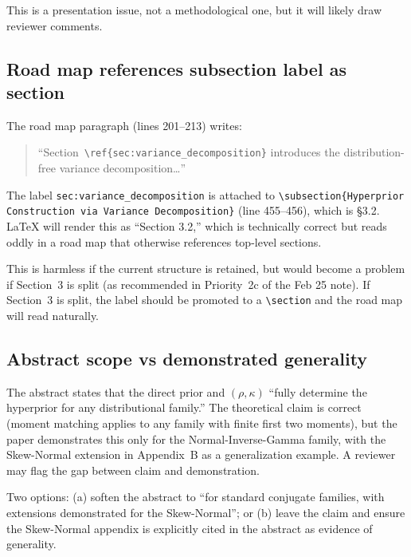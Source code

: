 \documentclass[12pt,a4paper]{article}
\begin{document}
This is a presentation issue, not a methodological one, but it will likely
draw reviewer comments.


\subsection{Road map references subsection label as section}

The road map paragraph (lines 201--213) writes:

\begin{quote}
  ``Section~\verb|\ref{sec:variance_decomposition}| introduces the
  distribution-free variance decomposition\ldots''
\end{quote}

The label \verb|sec:variance_decomposition| is attached to
\verb|\subsection{Hyperprior Construction via Variance Decomposition}| (line
455--456), which is \S3.2. LaTeX will render this as ``Section 3.2,'' which is
technically correct but reads oddly in a road map that otherwise references
top-level sections.

This is harmless if the current structure is retained, but would become a
problem if Section~3 is split (as recommended in Priority~2c of the Feb 25
note). If Section~3 is split, the label should be promoted to a
\verb|\section| and the road map will read naturally.


\subsection{Abstract scope vs demonstrated generality}

The abstract states that the direct prior and $(\rho, \kappa)$ ``fully
determine the hyperprior for any distributional family.'' The theoretical claim
is correct (moment matching applies to any family with finite first two
moments), but the paper demonstrates this only for the Normal-Inverse-Gamma
family, with the Skew-Normal extension in Appendix~B as a generalization
example. A reviewer may flag the gap between claim and demonstration.

Two options: (a) soften the abstract to ``for standard conjugate families,
with extensions demonstrated for the Skew-Normal''; or (b) leave the claim
and ensure the Skew-Normal appendix is explicitly cited in the abstract as
evidence of generality.
\end{document}

